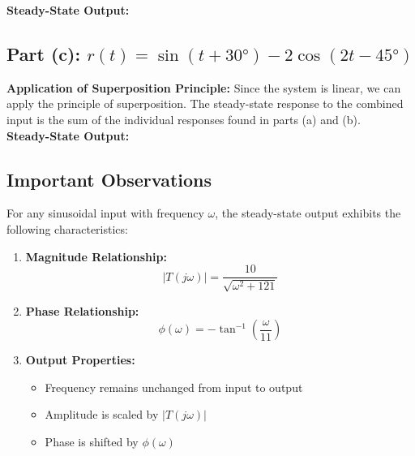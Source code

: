 \documentclass{article}
\begin{document}
{\color{solutionblue}\textbf{Steady-State Output:}
}

\subsection*{Part (c): $r(t) = \sin(t + 30°) - 2\cos(2t - 45°)$}
\textbf{Application of Superposition Principle:}
{Since the system is linear, we can apply the principle of superposition. The steady-state response to the combined input is the sum of the individual responses found in parts (a) and (b).}\\

{\color{solutionblue}
\textbf{Steady-State Output:}
}

\subsection*{Important Observations}
For any sinusoidal input with frequency $\omega$, the steady-state output exhibits the following characteristics:

\begin{enumerate}
    \item \textbf{Magnitude Relationship:}
    \[
    |T(j\omega)| = \frac{10}{\sqrt{\omega^2 + 121}}
    \]
    
    \item \textbf{Phase Relationship:}
    \[
    \phi(\omega) = -\tan^{-1}\left(\frac{\omega}{11}\right)
    \]
    
    \item \textbf{Output Properties:}
    \begin{itemize}
        \item Frequency remains unchanged from input to output
        \item Amplitude is scaled by $|T(j\omega)|$
        \item Phase is shifted by $\phi(\omega)$
    \end{itemize}
\end{enumerate}

\end{document}
